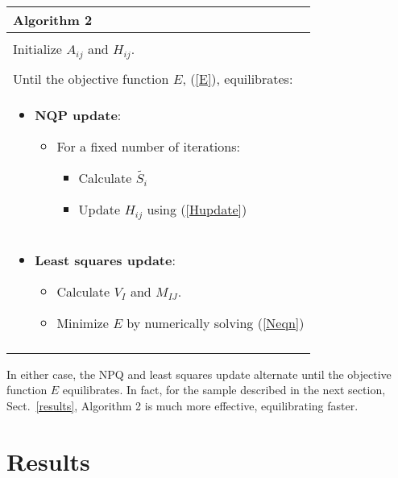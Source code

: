 \documentclass[11pt,twocolumn]{IEEEtran}
\begin{document}
\begin{tabular}{p{8.25cm}}
\\
{\bf Algorithm 2}\\
\hline\\
Initialize $A_{ij}$ and $H_{ij}$.\\
\\
Until the objective function $E$, (\ref{E}), equilibrates:\\ 
\begin{itemize}
\item[] {\bf NQP update}: 
\begin{itemize}
\item[] For a fixed number of iterations:
\begin{itemize}
\item[] Calculate $\tilde{S_i}$
\item[] Update $H_{ij}$ using (\ref{Hupdate})
\end{itemize}
\end{itemize}
\end{itemize}
\\
\begin{itemize}
\item[] {\bf Least squares update}: 
\begin{itemize}
\item[] Calculate $V_I$ and $M_{IJ}$.
\item[] Minimize $E$ by numerically solving (\ref{Neqn})
\end{itemize}
\end{itemize}\\
\hline\\
\end{tabular}
In either case, the NPQ and least squares update alternate until the
objective function $E$ equilibrates. In fact, for the sample described in the
next section, Sect.~\ref{results}, Algorithm 2 is much more effective, equilibrating
faster.

\section{Results\label{results}}
\end{document}
